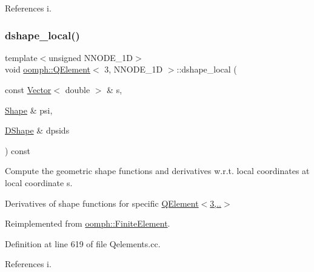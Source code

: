 References i.

\mbox{\label{classoomph_1_1QElement_3_013_00_01NNODE__1D_01_4_a4fc5d4c2a2a617e8684285c96f058460}} 
\subsubsection{\texorpdfstring{dshape\+\_\+local()}{dshape\_local()}}
{\footnotesize\ttfamily template$<$unsigned N\+N\+O\+D\+E\+\_\+1D$>$ \\
void \hyperlink{classoomph_1_1QElement}{oomph\+::\+Q\+Element}$<$ 3, N\+N\+O\+D\+E\+\_\+1D $>$\+::dshape\+\_\+local (\begin{DoxyParamCaption}\item[{const \hyperlink{classoomph_1_1Vector}{Vector}$<$ double $>$ \&}]{s,  }\item[{\hyperlink{classoomph_1_1Shape}{Shape} \&}]{psi,  }\item[{\hyperlink{classoomph_1_1DShape}{D\+Shape} \&}]{dpsids }\end{DoxyParamCaption}) const\hspace{0.3cm}{\ttfamily [virtual]}}



Compute the geometric shape functions and derivatives w.\+r.\+t. local coordinates at local coordinate s. 

Derivatives of shape functions for specific \hyperlink{classoomph_1_1QElement_3_013_00_01NNODE__1D_01_4_a67a7cfffb80e609cdfd1ec534a9c19bd}{Q\+Element$<$3,..$>$} 

Reimplemented from \hyperlink{classoomph_1_1FiniteElement_a9db1456b827131c21a991ac9fedf4b0c}{oomph\+::\+Finite\+Element}.



Definition at line 619 of file Qelements.\+cc.



References i.

\mbox{\label{classoomph_1_1QElement_3_013_00_01NNODE__1D_01_4_a27d826493ef1ae3d2898409f302d37f8}} 
